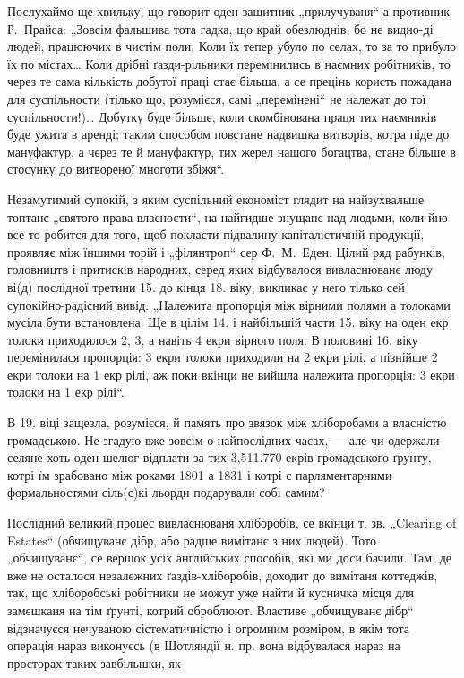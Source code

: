 Послухаймо ще хвильку, що говорит оден защитник „прилучуваня“ а противник Р.~Прайса: „Зовсім
фальшива тота гадка, що край обезлюднів, бо не видно-ді людей, працюючих в чистім поли. Коли їх
тепер убуло по селах, то за то прибуло їх по містах\dots{} Коли дрібні ґазди-рільники перемінились в
наємних робітників, то через те сама кількість добутої праці стає більша, а се прецінь користь
пожадана для суспільности (тілько що, розумієся, самі „перемінені“ не належат до тої
суспільности!)\dots{} Добутку буде більше, коли скомбінована праця тих наємників буде ужита в 
аренді; таким способом повстане надвишка витворів, котра піде до мануфактур, а через те й
мануфактур, тих жерел нашого богацтва, стане більше в стосунку до витвореної многоти збіжя“.

Незамутимий супокій, з яким суспільний економіст глядит на найзухвальше топтанє „святого права
власности“, на найгидше знущанє над людьми, коли йно все то робится для того, щоб покласти підвалину
капіталістичній продукції, проявляє між їншими торій і „філянтроп“ сер Ф.~М.~Еден. Цілий ряд
рабунків, головництв і притисків народних, серед яких відбувалося вивласнюванє люду ві(д) послідної
третини 15. до кінця 18. віку, викликає у него тілько сей супокійно-радісний вивід: „Належита
пропорція між вірними полями а толоками мусіла бути встановлена. Ще в цілім 14. і найбільшій части
15. віку на оден екр толоки приходилося 2, 3, а навіть 4 екри вірного поля. В половині 16. віку
перемінилася пропорція: 3 екри толоки приходили на 2 екри рілі, а пізнійше 2 екри толоки на 1 екр
рілі, аж поки вкінци не вийшла належита пропорція: 3 екри толоки на 1 екр рілі“.

В 19. віці защезла, розумієся, й память про звязок між хліборобами а власністю громадською. Не
згадую вже зовсім о найпослідних часах, — але чи одержали селяне хоть оден шелюг відплати за тих
3,511.770 екрів громадського ґрунту, котрі їм зрабовано між роками 1801 а 1831 і котрі с
парляментарними формальностями сіль(с)кі льорди подарували собі самим?

Послідний великий процес вивласнюваня хліборобів, се вкінци т. зв. „\textenglish{Clearing of Estates}“ (обчищуванє
дібр, або радше вимітанє з них людей). Тото „обчищуванє“, се вершок усіх англійських способів, які
ми доси бачили. Там, де вже не осталося незалежних ґаздів-хліборобів, доходит до вимітаня коттеджів,
так, що хліборобські робітники не можут уже найти й кусничка місця для замешканя на тім ґрунті,
котрий оброблюют. Властиве „обчищуванє дібр“ відзначуєся нечуваною сістематичністю і огромним
розміром, в якім тота операція нараз виконуєсь (в Шотляндії н. пр.
вона відбувалася нараз на просторах таких завбільшки, як
\parbreak{}
